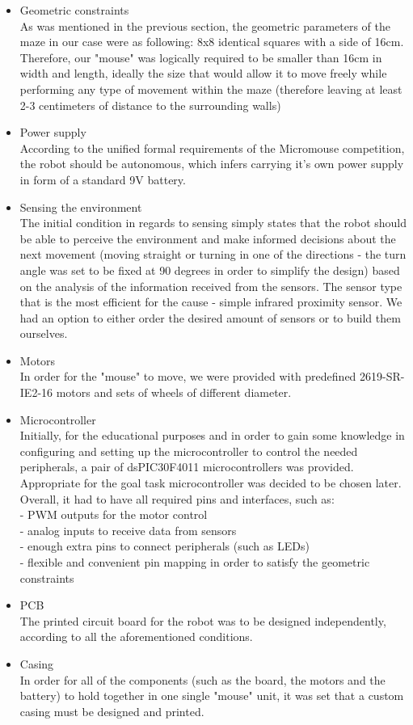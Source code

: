 \begin{itemize}
    \item Geometric constraints\\ 
    As was mentioned in the previous section, the geometric parameters of the maze in our case were as following: 8x8 identical squares with a side of 16cm. Therefore, our "mouse" was logically required to be smaller than 16cm in width and length, ideally the size that would allow it to move freely while performing any type of movement within the maze (therefore leaving at least 2-3 centimeters of distance to the surrounding walls)
    \item Power supply\\
    According to the unified formal requirements of the Micromouse competition, the robot should be autonomous, which infers carrying it's own power supply in form of a standard 9V battery.
    \item Sensing the environment\\
    The initial condition in regards to sensing simply states that the robot should be able to perceive the environment and make informed decisions about the next movement (moving straight or turning in one of the directions - the turn angle was set to be fixed at 90 degrees in order to simplify the design) based on the analysis of the information received from the sensors. The sensor type that is the most efficient for the cause - simple infrared proximity sensor. We had an option to either order the desired amount of sensors or to build them ourselves.
    \item Motors\\
    In order for the "mouse" to move, we were provided with predefined 2619-SR-IE2-16 motors and sets of wheels of different diameter.
    \item Microcontroller\\
    Initially, for the educational purposes and in order to gain some knowledge in configuring and setting up the microcontroller to control the needed peripherals, a pair of dsPIC30F4011 microcontrollers was provided. Appropriate for the goal task microcontroller was decided to be chosen later. Overall, it had to have all required pins and interfaces, such as:\\
    - PWM outputs for the motor control\\
    - analog inputs to receive data from sensors\\
    - enough extra pins to connect peripherals (such as LEDs)\\
    - flexible and convenient pin mapping in order to satisfy the geometric constraints
    \item PCB\\
    The printed circuit board for the robot was to be designed independently, according to all the aforementioned conditions.
    \item Casing\\
    In order for all of the components (such as the board, the motors and the battery) to hold together in one single "mouse" unit, it was set that a custom casing must be designed and printed.
\end{itemize}


